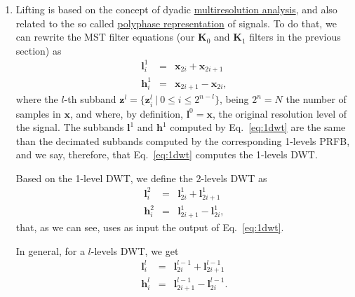 \begin{enumerate}

\item Lifting is based on the concept of dyadic
  \href{https://en.wikipedia.org/wiki/Multiresolution_analysis}{multiresolution
    analysis}, and also related to the so called
  \href{https://en.wikipedia.org/wiki/Polyphase_matrix}{polyphase
    representation} of signals. To do that, we can rewrite
  the MST filter equations (our ${\mathbf K}_0$ and ${\mathbf K}_1$
  filters in the previous section) as
  \begin{equation}
    \begin{array}{rcl}
      {\mathbf l}^1_i & = & {\mathbf x}_{2i} + {\mathbf x}_{2i+1} \\
      {\mathbf h}^1_i & = & {\mathbf x}_{2i+1} - {\mathbf x}_{2i},
    \end{array}
    \label{eq:1dwt}
  \end{equation}
  where the $l$-th subband
  ${\mathbf z}^l=\{{\mathbf z}_i^l~|~0\le i\le 2^{n-l}\}$, being
  $2^n=N$ the number of samples in ${\mathbf x}$, and where, by
  definition, ${\mathbf l}^0={\mathbf x}$, the original resolution
  level of the signal. The subbands ${\mathbf l}^1$ and
  ${\mathbf h}^1$ computed by Eq.~\eqref{eq:1dwt} are the same than
  the decimated subbands computed by the corresponding 1-levels PRFB,
  and we say, therefore, that Eq.~\eqref{eq:1dwt} computes the
  1-levels DWT.

  Based on the 1-level DWT, we define the 2-levels DWT as
  \begin{equation}
    \begin{array}{rcl}
      {\mathbf l}^2_i & = & {\mathbf l}^1_{2i} + {\mathbf l}^1_{2i+1} \\
      {\mathbf h}^2_i & = & {\mathbf l}^1_{2i+1} - {\mathbf l}^1_{2i},
    \end{array}
    \label{eq:2dwt}
  \end{equation}
  that, as we can see, uses as input the output of Eq.~\eqref{eq:1dwt}.

  In general, for a $l$-levels DWT, we get
    \begin{equation}
    \begin{array}{rcl}
      {\mathbf l}^l_i & = & {\mathbf l}^{l-1}_{2i} + {\mathbf l}^{l-1}_{2i+1} \\
      {\mathbf h}^l_i & = & {\mathbf l}^{l-1}_{2i+1} - {\mathbf l}^{l-1}_{2i}.
    \end{array}
    \label{eq:ldwt}
  \end{equation}


\end{enumerate}
